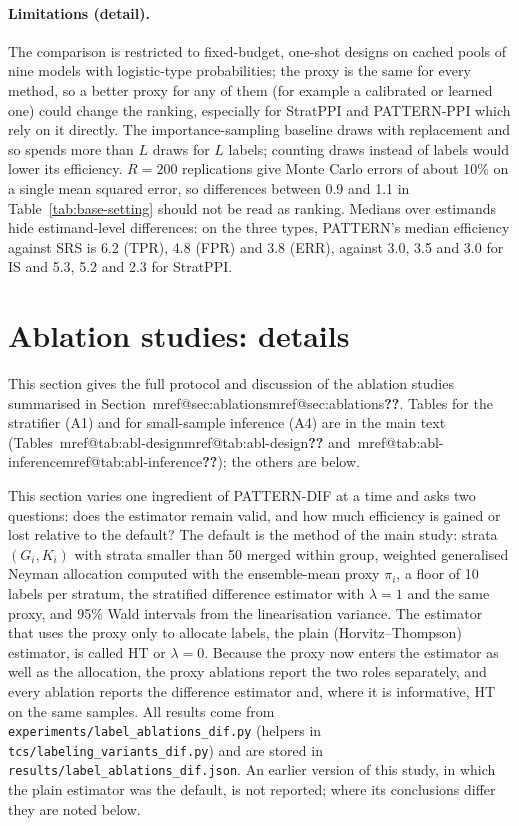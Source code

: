 \documentclass[pdflatex,sn-mathphys-num,iicol]{sn-jnl}
\makeatletter
\theoremstyle{thmstyleone}
\theoremstyle{thmstyletwo}
\theoremstyle{thmstylethree}
\newcommand{\Mref}[1]{\ifcsname mref@#1\endcsname\csname mref@#1\endcsname\else\textbf{??}\fi}
\makeatother
\begin{document}
\paragraph{Limitations (detail).} The comparison is restricted to fixed-budget, one-shot designs on cached pools of nine models with logistic-type probabilities; the proxy is the same for every method, so a better proxy for any of them (for example a calibrated or learned one) could change the ranking, especially for StratPPI and PATTERN-PPI which rely on it directly. The importance-sampling baseline draws with replacement and so spends more than $L$ draws for $L$ labels; counting draws instead of labels would lower its efficiency. $R=200$ replications give Monte Carlo errors of about 10\% on a single mean squared error, so differences between 0.9 and 1.1 in Table~\ref{tab:base-setting} should not be read as ranking. Medians over estimands hide estimand-level differences: on the three types, PATTERN's median efficiency against SRS is 6.2 (TPR), 4.8 (FPR) and 3.8 (ERR), against 3.0, 3.5 and 3.0 for IS and 5.3, 5.2 and 2.3 for StratPPI.

\section{Ablation studies: details}\label{si:ablations}

This section gives the full protocol and discussion of the ablation studies summarised in Section~\Mref{sec:ablations}. Tables for the stratifier (A1) and for small-sample inference (A4) are in the main text (Tables~\Mref{tab:abl-design} and~\Mref{tab:abl-inference}); the others are below.

This section varies one ingredient of PATTERN-DIF at a time and asks two questions: does the estimator remain valid, and how much efficiency is gained or lost relative to the default? The default is the method of the main study: strata $(G_i,K_i)$ with strata smaller than 50 merged within group, weighted generalised Neyman allocation \citep{neyman1934} computed with the ensemble-mean proxy $\pi_i$, a floor of 10 labels per stratum, the stratified difference estimator with $\lambda=1$ and the same proxy, and 95\% Wald intervals from the linearisation variance. The estimator that uses the proxy only to allocate labels, the plain (Horvitz--Thompson) estimator, is called HT or $\lambda=0$. Because the proxy now enters the estimator as well as the allocation, the proxy ablations report the two roles separately, and every ablation reports the difference estimator and, where it is informative, HT on the same samples. All results come from \texttt{experiments/label\_ablations\_dif.py} (helpers in \texttt{tcs/labeling\_variants\_dif.py}) and are stored in \texttt{results/label\_ablations\_dif.json}. An earlier version of this study, in which the plain estimator was the default, is not reported; where its conclusions differ they are noted below.
\end{document}
